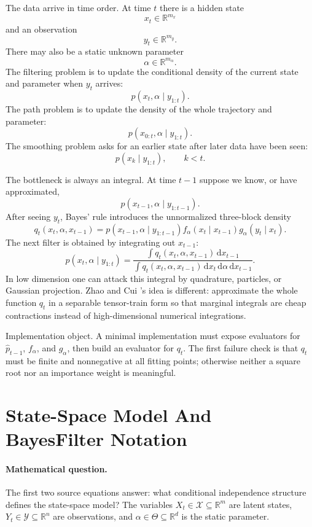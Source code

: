 \documentclass[11pt]{article}
\numberwithin{equation}{section}
\newcommand{\R}{\mathbb R}
\newcommand{\dd}{\,\mathrm d}
\begin{document}
The data arrive in time order.  At time \(t\) there is a hidden state
\[
    x_t\in \R^{m_x}
\]
and an observation
\[
    y_t\in \R^{m_y}.
\]
There may also be a static unknown parameter
\[
    \alpha\in \R^{m_\alpha}.
\]
The filtering problem is to update the conditional density of the current state
and parameter when \(y_t\) arrives:
\[
    p(x_t,\alpha\mid y_{1:t}).
\]
The path problem is to update the density of the whole trajectory and parameter:
\[
    p(x_{0:t},\alpha\mid y_{1:t}).
\]
The smoothing problem asks for an earlier state after later data have been seen:
\[
    p(x_k\mid y_{1:t}),\qquad k<t.
\]

The bottleneck is always an integral.  At time \(t-1\) suppose we know, or have
approximated,
\[
    p(x_{t-1},\alpha\mid y_{1:t-1}).
\]
After seeing \(y_t\), Bayes' rule introduces the unnormalized three-block
density
\[
    q_t(x_t,\alpha,x_{t-1})
    =
    p(x_{t-1},\alpha\mid y_{1:t-1})
    f_\alpha(x_t\mid x_{t-1})
    g_\alpha(y_t\mid x_t).
\]
The next filter is obtained by integrating out \(x_{t-1}\):
\[
    p(x_t,\alpha\mid y_{1:t})
    =
    \frac{\int q_t(x_t,\alpha,x_{t-1})\dd x_{t-1}}
    {\int q_t(x_t,\alpha,x_{t-1})\dd x_t\dd\alpha\dd x_{t-1}}.
\]
In low dimension one can attack this integral by quadrature, particles, or
Gaussian projection.  Zhao and Cui \cite{zhao2024ttsequential}'s idea is different: approximate the whole
function \(q_t\) in a separable tensor-train form so that marginal integrals are
cheap contractions instead of high-dimensional numerical integrations.

Implementation object.  A minimal implementation must expose evaluators for
\(\widehat p_{t-1}\), \(f_\alpha\), and \(g_\alpha\), then build an evaluator
for \(q_t\).  The first failure check is that \(q_t\) must be finite and
nonnegative at all fitting points; otherwise neither a square root nor an
importance weight is meaningful.

\section{State-Space Model And BayesFilter Notation}

\paragraph{Mathematical question.}
The first two source equations answer: what conditional independence structure
defines the state-space model?  The variables \(X_t\in\mathcal X\subseteq\R^m\)
are latent states, \(Y_t\in\mathcal Y\subseteq\R^n\) are observations, and
\(\alpha\in\Theta\subseteq\R^d\) is the static parameter.
\end{document}
